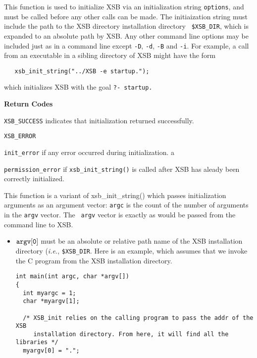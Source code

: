 \begin{description}

 This function is used to initialize
XSB via an initialization string {\tt *options}, and must be called
before any other calls can be made.  The initiaization string must
include the path to the XSB directory installation directory {\tt
\$XSB\_DIR}, which is expanded to an absolute path by XSB.  Any other
  command line options may be included just as in a command line
  except {\tt -D}, {\tt -d}, {\tt -B} and {\tt -i}.  For example, a
  call from an executable in a sibling directory of XSB might have the
  form
\begin{verbatim}
   xsb_init_string("../XSB -e startup.");
\end{verbatim}
which initializes XSB with the goal {\tt ?- startup.}

{\bf Return Codes}  
\bi
\item {\tt XSB\_SUCCESS} indicates that initialization returned
  successfully.
%
\item {\tt XSB\_ERROR} 
\bi
\item {\tt init\_error} if any error occurred during initialization. a

\item {\tt permission\_error} if {\tt xsb\_init\_string()} is called
  after XSB has aleady been correctly initialized.  
\ei
%
\ei

 
%
This function is a variant of xsb\_init\_string() which passes
initialization arguments as an argument vector: {\tt argc} is the
count of the number of arguments in the {\tt argv} vector.  The {\tt
  argv} vector is exactly as would be passed from the command line to
XSB.
\begin{itemize}
\item $\tt argv[0]$ must be an absolute or relative path name of the XSB
  installation directory ({\it i.e.}, {\tt \$XSB\_DIR}.  Here is an
  example, which assumes that we invoke the C program from the XSB
  installation directory.
    \begin{verbatim}
int main(int argc, char *argv[])
{ 
  int myargc = 1;
  char *myargv[1];

  /* XSB_init relies on the calling program to pass the addr of the XSB
     installation directory. From here, it will find all the libraries */
  myargv[0] = ".";


\end{verbatim}
\end{itemize}
\end{description}
